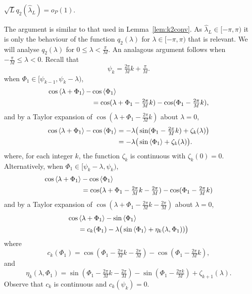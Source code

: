 \documentclass[journal]{IEEEtran}
\begin{document}
\begin{lemma}\label{lem:XL} 
$\sqrt{L} q_2(\hat{\lambda}_L) = o_P(1)$.
\end{lemma}
\begin{IEEEproof}
The argument is similar to that used in Lemma~\ref{lem:k2conv}.  As $\hat{\lambda}_L \in [-\pi, \pi)$ it is only the behaviour of the function $q_2(\lambda)$ for $\lambda\in [-\pi, \pi)$ that is relevant.  We will analyse $q_2(\lambda)$ for $0 \leq \lambda < \tfrac{\pi}{M}$.  An analagous argument follows when $-\tfrac{\pi}{M} \leq \lambda < 0$.  Recall that
\[
\psi_k = \tfrac{2\pi}{M}k + \tfrac{\pi}{M}.
\]
when $\Phi_1 \in [\psi_{k-1}, \psi_{k} - \lambda )$,
\begin{align*}
\cos\left\langle \lambda + \Phi_1 \right\rangle - &\cos\left\langle \Phi_1 \right\rangle \\
&= \cos(\lambda + \Phi_1 - \tfrac{2\pi}{M}k) - \cos(\Phi_1 - \tfrac{2\pi}{M}k),
\end{align*}
and by a Taylor expansion of $\cos(\lambda + \Phi_1 - \tfrac{2\pi}{M}k)$ about $\lambda = 0$, 
\begin{align*}
\cos\left\langle \lambda + \Phi_1 \right\rangle - \cos\left\langle \Phi_1 \right\rangle &= -\lambda\big(\sin(\Phi_1 - \tfrac{2\pi}{M}k) + \zeta_k(\lambda)\big) \\
&= -\lambda\big(\sin\left\langle \Phi_1 \right\rangle + \zeta_k(\lambda)\big).
\end{align*}
where, for each integer $k$, the function $\zeta_k$ is continuous with $\zeta_k(0) = 0$.   Alternatively, when $\Phi_1 \in [ \psi_{k} - \lambda,\psi_{k})$,
\begin{align*}
\cos\left\langle \lambda + \Phi_1 \right\rangle &- \cos\left\langle \Phi_1 \right\rangle \\
&= \cos(\lambda + \Phi_1 - \tfrac{2\pi}{M}k - \tfrac{2\pi}{M}) - \cos(\Phi_1 - \tfrac{2\pi}{M}k)
\end{align*}
and by a Taylor expansion of $\cos(\lambda + \Phi_1 - \tfrac{2\pi}{M}k - \tfrac{2\pi}{M})$ about $\lambda = 0$,
\begin{align*}
\cos&\left\langle \lambda + \Phi_1 \right\rangle - \sin\left\langle \Phi_1 \right\rangle \\
&= c_k(\Phi_1) - \lambda\big(\sin\left\langle \Phi_1 \right\rangle + \eta_k(\lambda, \Phi_1)  )\big)
\end{align*}
where
\[
c_k(\Phi_1) = \cos(\Phi_1 - \tfrac{2\pi}{M}k - \tfrac{2\pi}{M}) - \cos(\Phi_1 - \tfrac{2\pi}{M}k),
\]
and
\[
\eta_k(\lambda, \Phi_1) = \sin(\Phi_1 - \tfrac{2\pi}{M}k - \tfrac{2\pi}{M}) - \sin(\Phi_1 - \tfrac{2\pi k}{M}) + \zeta_{k+1}(\lambda).
\]
Observe that $c_k$ is continuous and $c_k(\psi_{k}) = 0$.


\end{IEEEproof}
\end{document}
